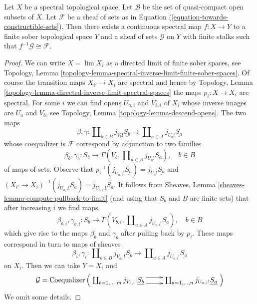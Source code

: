 \begin{lemma}
\label{lemma-constructible-comes-from-finite}
Let $X$ be a spectral topological space. Let $\mathcal{B}$ be
the set of quasi-compact open subsets of $X$.
Let $\mathcal{F}$ be a sheaf of sets as in
Equation (\ref{equation-towards-constructible-sets}).
Then there exists a continuous spectral map $f : X \to Y$
to a finite sober topological space $Y$ and a sheaf
of sets $\mathcal{G}$ on $Y$ with finite stalks
such that $f^{-1}\mathcal{G} \cong \mathcal{F}$.
\end{lemma}

\begin{proof}
We can write $X = \lim X_i$ as a directed limit
of finite sober spaces, see Topology, Lemma
\ref{topology-lemma-spectral-inverse-limit-finite-sober-spaces}.
Of course the transition maps $X_{i'} \to X_i$ are spectral and hence
by Topology, Lemma \ref{topology-lemma-directed-inverse-limit-spectral-spaces}
the maps $p_i : X \to X_i$ are spectral.
For some $i$ we can find opens $U_{a, i}$ and $V_{b, i}$
of $X_i$ whose inverse images are $U_a$ and $V_b$, see
Topology, Lemma \ref{topology-lemma-descend-opens}.
The two maps
$$
\beta, \gamma :
\coprod\nolimits_{b \in B} j_{V_b!}\underline{S_b}
\longrightarrow
\coprod\nolimits_{a \in A} j_{U_a!}\underline{S_a}
$$
whose coequalizer is $\mathcal{F}$ correspond by adjunction to two families
$$
\beta_b, \gamma_b :
S_b
\longrightarrow
\Gamma(V_b, \coprod\nolimits_{a \in A} j_{U_a!}\underline{S_a}), \quad
b \in B
$$
of maps of sets. Observe that
$p_i^{-1}(j_{U_{a, i}!}\underline{S_a}) = j_{U_a!}\underline{S_a}$
and $(X_{i'} \to X_i)^{-1}(j_{U_{a, i}!}\underline{S_a}) =
j_{U_{a, i'}!}\underline{S_a}$. It follows from
Sheaves, Lemma \ref{sheaves-lemma-compute-pullback-to-limit}
(and using that $S_b$ and $B$ are finite sets) that
after increasing $i$ we find maps
$$
\beta_{b, i}, \gamma_{b, i} :
S_b
\longrightarrow
\Gamma(V_{b, i}, \coprod\nolimits_{a \in A} j_{U_{a, i}!}\underline{S_a})
, \quad b \in B
$$
which give rise to the maps $\beta_b$ and $\gamma_b$ after pulling
back by $p_i$. These maps correspond in turn to maps of sheaves
$$
\beta_i, \gamma_i :
\coprod\nolimits_{b \in B} j_{V_{b, i}!}\underline{S_b}
\longrightarrow
\coprod\nolimits_{a \in A} j_{U_{a, i}!}\underline{S_a}
$$
on $X_i$. Then we can take $Y = X_i$ and
$$
\mathcal{G} =
\text{Coequalizer}\left(
\xymatrix{
\coprod\nolimits_{b = 1, \ldots, m} j_{V_{b, i}!}\underline{S_b}
\ar@<1ex>[r] \ar@<-1ex>[r] &
\coprod\nolimits_{a = 1, \ldots, n} j_{U_{a, i}!}\underline{S_a}
}
\right)
$$
We omit some details.
\end{proof}

